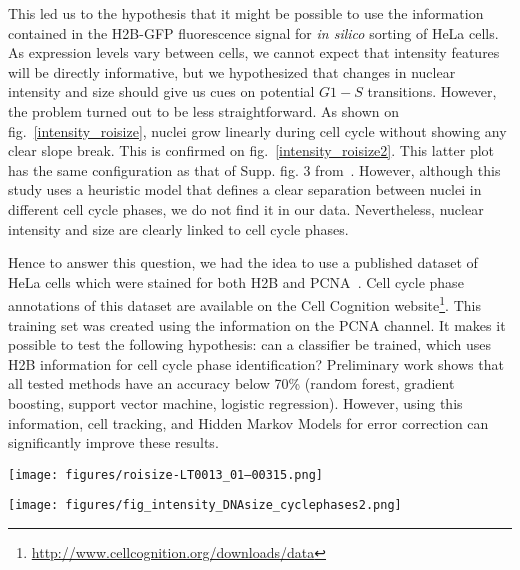 This led us to the hypothesis that it might be possible to use the
information contained in the H2B-GFP fluorescence signal for
\textit{in silico} sorting of HeLa cells. As expression levels vary
between cells, we cannot expect that intensity features will be
directly informative, but we hypothesized that changes in nuclear intensity
and size should give us cues on potential $G1-S$ transitions. However,
the problem turned out to be less straightforward. 
As shown on
fig.~\ref{intensity_roisize}, nuclei grow linearly during cell cycle
without showing any clear slope break. This is confirmed on
fig.~\ref{intensity_roisize2}. This latter plot has the same
configuration as that of Supp. fig. 3
from~\cite{pmid17401369}. However, although this study uses a
heuristic model that defines a clear separation between nuclei in
different cell cycle phases, we do not find it in our data. 
Nevertheless, nuclear intensity and size are clearly linked to cell cycle phases. 

Hence to answer this question, we had the idea to use a published
dataset of HeLa cells which were stained for both H2B and
PCNA~\cite{cellcognition}. Cell cycle phase annotations of this
dataset are available on the Cell Cognition
website\footnote{\href{http://www.cellcognition.org/downloads/data}{http://www.cellcognition.org/downloads/data}}. This
training set was created using the information on the PCNA channel. It
makes it possible to test the following hypothesis: can a classifier
be trained, which uses H2B information for cell cycle phase
identification? Preliminary work shows that all tested methods have an
accuracy below 70\% (random forest, gradient boosting, support vector
machine, logistic regression). However, using this information, cell tracking, and Hidden Markov Models for error correction can significantly improve these results. 


\begin{figure*}[ht!]
\centerline{\texttt{[image: figures/roisize-LT0013\_01--00315.png]}
}
\caption{Example of the time evolutions of nuclear size ("roisize", top left and bottom) and nuclear intensity ("total intensity", top right) for all complete trajectories of a control experiment from the Mitocheck dataset. As discussed in the text, no clear slope break is seen for most trajectories for any of the two indicators, hence preventing the delimitation of cell cycle phases using only this information.}
\label{intensity_roisize}
\end{figure*}
\begin{figure*}[ht!]
\centerline{\texttt{[image: figures/fig\_intensity\_DNAsize\_cyclephases2.png]}
}
\caption{DNA intensity and size as provided by H2B-GFP information is not sufficient to differenciate between the different cell cycle phases. Data and labelling come from the PCNA dataset.}
\label{intensity_roisize2}
\end{figure*}
\clearpage
